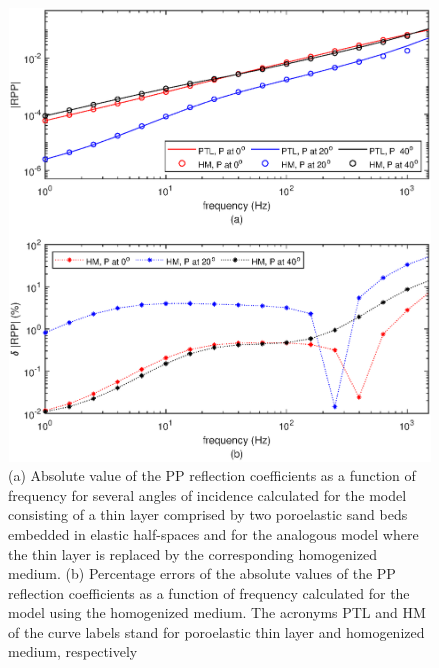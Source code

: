 \documentclass[draft]{agujournal2019}
\begin{document}

\begin{figure}[!ht]
\centering
        \includegraphics[width= 120mm, height=120mm]{rppbg_2sandshale.eps}
\caption{ (a) Absolute value of the PP reflection coefficients as a function of frequency for several angles of incidence calculated for the  model consisting of a thin layer comprised by two poroelastic sand beds embedded in elastic half-spaces and for the analogous model where the thin layer is replaced by the corresponding homogenized medium.  (b) Percentage errors of the absolute values of the PP reflection coefficients as a function of frequency calculated for the model using the homogenized medium. The acronyms PTL and HM of the curve labels stand for poroelastic thin layer and homogenized medium, respectively}
\label{fig.3}
\end{figure}
\end{document}
